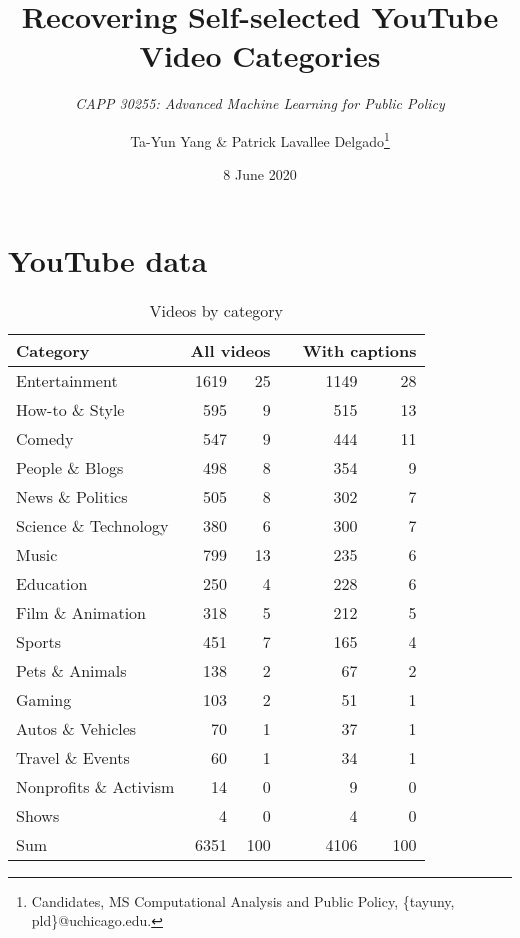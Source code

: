 \documentclass[letterpaper, 12pt]{article}
\title{Recovering Self-selected YouTube Video Categories}
\subtitle{\textit{CAPP 30255: Advanced Machine Learning for Public Policy}}
\author{Ta-Yun Yang \& Patrick Lavallee Delgado\thanks{Candidates, MS Computational Analysis and Public Policy, \{tayuny, pld\}@uchicago.edu.}}
\date{8 June 2020}
\begin{document}
\maketitle

\section{YouTube data}

\begin{table}[H]
  \centering
  \caption*{Videos by category}
  \begin{tabular}{lrr@{\%}p{1em}rr@{\%}}
    \toprule
    Category & \multicolumn{2}{l}{All videos} & & \multicolumn{2}{l}{With captions} \\
    \midrule
    Entertainment           & 1619  & 25  & & 1149  & 28  \\
    How-to \& Style         & 595   & 9   & & 515   & 13  \\
    Comedy                  & 547   & 9   & & 444   & 11  \\
    People \& Blogs         & 498   & 8   & & 354   & 9   \\
    News \& Politics        & 505   & 8   & & 302   & 7   \\
    Science \& Technology   & 380   & 6   & & 300   & 7   \\
    Music                   & 799   & 13  & & 235   & 6   \\
    Education               & 250   & 4   & & 228   & 6   \\ 
    Film \& Animation       & 318   & 5   & & 212   & 5   \\
    Sports                  & 451   & 7   & & 165   & 4   \\
    Pets \& Animals         & 138   & 2   & & 67    & 2   \\
    Gaming                  & 103   & 2   & & 51    & 1   \\
    Autos \& Vehicles       & 70    & 1   & & 37    & 1   \\
    Travel \& Events        & 60    & 1   & & 34    & 1   \\
    Nonprofits \& Activism  & 14    & 0   & & 9     & 0   \\
    Shows                   & 4     & 0   & & 4     & 0   \\
    \bottomrule
    Sum                     & 6351  & 100 & & 4106  & 100 \\
  \end{tabular}
\end{table}
\end{document}
